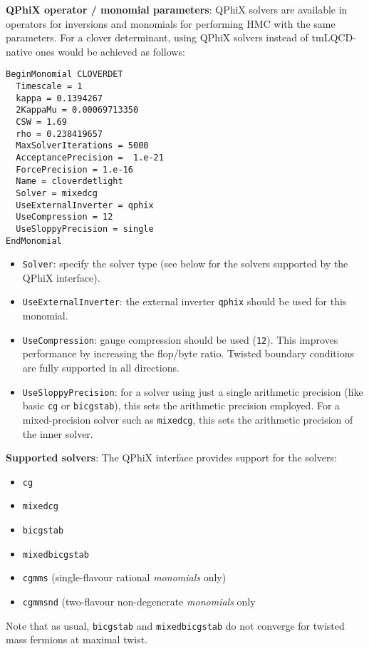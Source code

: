 \noindent\textbf{QPhiX operator / monomial parameters}: QPhiX solvers are available in operators for inversions and monomials for performing HMC with the same parameters.
For a clover determinant, using QPhiX solvers instead of tmLQCD-native ones would be achieved as follows:
\begin{framed}
\begin{Verbatim}
BeginMonomial CLOVERDET
  Timescale = 1
  kappa = 0.1394267
  2KappaMu = 0.00069713350
  CSW = 1.69
  rho = 0.238419657
  MaxSolverIterations = 5000
  AcceptancePrecision =  1.e-21
  ForcePrecision = 1.e-16
  Name = cloverdetlight
  Solver = mixedcg
  UseExternalInverter = qphix
  UseCompression = 12
  UseSloppyPrecision = single
EndMonomial  
\end{Verbatim}
\end{framed}
\begin{itemize}
  \item{\texttt{Solver}: specify the solver type (see below for the solvers supported by the QPhiX interface).} 
  \item{\texttt{UseExternalInverter}: the external inverter \texttt{qphix} should be used for this monomial.}
  \item{\texttt{UseCompression}: gauge compression should be used (\texttt{12}). This improves performance by increasing the flop/byte ratio. Twisted boundary conditions are fully supported in all directions.}
  \item{\texttt{UseSloppyPrecision}: for a solver using just a single arithmetic precision (like basic \texttt{cg} or \texttt{bicgstab}), this sets the arithmetic precision employed. For a mixed-precision solver such as \texttt{mixedcg}, this sets the arithmetic precision of the inner solver.}
\end{itemize}

\noindent\textbf{Supported solvers}: The QPhiX interface provides support for the solvers:
\begin{itemize}
\item{\texttt{cg}}
\item{\texttt{mixedcg}}
\item{\texttt{bicgstab}}
\item{\texttt{mixedbicgstab}}
\item{\texttt{cgmms} (single-flavour rational \emph{monomials} only)}
\item{\texttt{cgmmsnd} (two-flavour non-degenerate \emph{monomials} only}
\end{itemize}
Note that as usual, \texttt{bicgstab} and \texttt{mixedbicgstab} do not converge for twisted mass fermions at maximal twist.